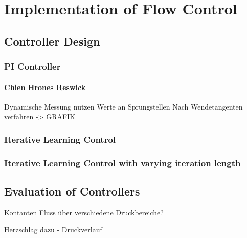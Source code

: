 \chapter{Implementation of Flow Control}
\section{Controller Design}
\subsection{PI Controller}
\subsubsection{Chien Hrones Reswick}
Dynamische Messung nutzen
Werte an Sprungstellen
Nach Wendetangenten verfahren -> GRAFIK
\subsection{Iterative Learning Control}
\subsection{Iterative Learning Control with varying iteration length}

\section{Evaluation of Controllers}
Kontanten Fluss über verschiedene Druckbereiche?


Herzschlag dazu - Druckverlauf
